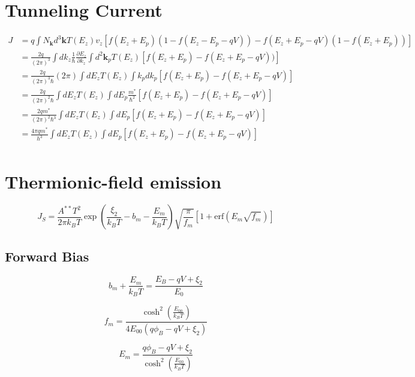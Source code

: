 \documentclass[11pt,uplatex,a4paper]{jsarticle}
\def\pd#1#2{\frac{\partial #1}{\partial #2}}
\def\vec#1{{\bm{#1}}}
\begin{document}
\section{Tunneling Current}
\begin{equation}
 \begin{split}
  J&= q \int N_{\vec{k}} d^3\vec{k} T(E_z) v_z
  [f(E_z + E_p)(1-f(E_z-E_p-qV))-f(E_z+E_p-qV)(1-f(E_z+E_p))] \\
  &=\frac{2q}{(2 \pi)^3} \int d k_z \frac{1}{\hbar}\pd{E_z}{k_z} \int d^2 \vec{k}_p
  T(E_z)[f(E_z+E_p)-f(E_z + E_p -qV))] \\
  &=\frac{2q}{(2 \pi)^3\hbar} (2 \pi) \int dE_z T(E_z) \int k_p dk_p[f(E_z+E_p) - f(E_z + E_p -qV)] \\
  &=\frac{2q}{(2 \pi)^2\hbar} \int dE_z T(E_z) \int dE_p \frac{m^*}{\hbar^2} [f(E_z+E_p) - f(E_z + E_p -qV)] \\
  & =\frac{2qm^*}{(2 \pi)^2\hbar^3} \int dE_z T(E_z) \int dE_p [f(E_z+E_p) - f(E_z + E_p -qV)] \\
  & =\frac{4 \pi q m^*}{h^3} \int dE_z T(E_z) \int dE_p [f(E_z+E_p) - f(E_z + E_p -qV)] \\
 \end{split}
\end{equation}

\section{Thermionic-field emission}
\begin{equation}
 J_S = \frac{A^{**}T^2}{2 \pi k_B T}
  \exp\left( \frac{\xi_2}{k_B T} - b_m - \frac{E_m}{k_B T}
			 \right)
  \sqrt{\frac{\pi}{f_m}}
  [1+\mathrm{erf}
(E_m \sqrt{f_m})]
\end{equation}

\subsection{Forward Bias}

\begin{equation}
 b_m + \frac{E_m}{k_B T} = \frac{E_B - qV + \xi_2}{E_0}
\end{equation}

\begin{equation}
 f_m = \frac{\cosh^2 \left(\frac{E_{00}}{k_B T}\right)}{4 E_{00}(q \phi_B - q V + \xi_2)}
\end{equation}

\begin{equation}
 E_m = \frac{q \phi_B - qV + \xi_2}{\cosh^2 \left(\frac{E_{00}}{k_B T}\right)}
\end{equation}
\end{document}
